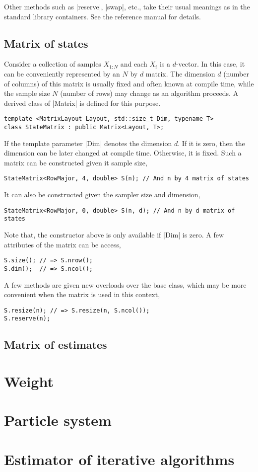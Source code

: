 Other methods such as |reserve|, |swap|, etc., take their usual meanings as in
the standard library containers. See the reference manual for details.

\subsection{Matrix of states}
\label{sub:Matrix of states}

Consider a collection of samples $X_{1:N}$ and each $X_i$ is a $d$-vector. In
this case, it can be conveniently represented by an $N$ by $d$ matrix. The
dimension $d$ (number of columns) of this matrix is usually fixed and often
known at compile time, while the sample size $N$ (number of rows) may change as
an algorithm proceeds. A derived class of |Matrix| is defined for this purpose.
\begin{verbatim}
template <MatrixLayout Layout, std::size_t Dim, typename T>
class StateMatrix : public Matrix<Layout, T>;
\end{verbatim}
If the template parameter |Dim| denotes the dimension $d$. If it is zero, then
the dimension can be later changed at compile time. Otherwise, it is fixed.
Such a matrix can be constructed given it sample size,
\begin{verbatim}
StateMatrix<RowMajor, 4, double> S(n); // And n by 4 matrix of states
\end{verbatim}
It can also be constructed given the sampler size and dimension,
\begin{verbatim}
StateMatrix<RowMajor, 0, double> S(n, d); // And n by d matrix of states
\end{verbatim}
Note that, the constructor above is only available if |Dim| is zero. A few
attributes of the matrix can be access,
\begin{verbatim}
S.size(); // => S.nrow();
S.dim();  // => S.ncol();
\end{verbatim}
A few methods are given new overloads over the base class, which may be more
convenient when the matrix is used in this context,
\begin{verbatim}
S.resize(n); // => S.resize(n, S.ncol());
S.reserve(n);
\end{verbatim}

\subsection{Matrix of estimates}
\label{sub:Matrix of estimates}

\section{Weight}
\label{sec:Weight}

\section{Particle system}
\label{sec:Particle system}

\section{Estimator of iterative algorithms}
\label{sec:Estimator of iterative algorithms}
